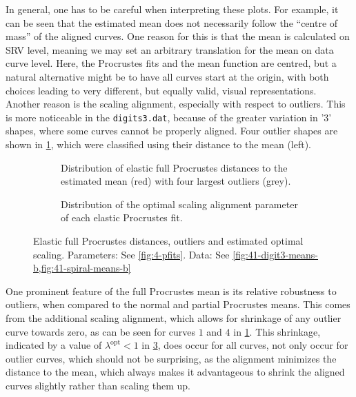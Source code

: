 In general, one has to be careful when interpreting these plots.
For example, it can be seen that the estimated mean does not necessarily follow the \enquote{centre of mass} of the aligned curves. 
One reason for this is that the mean is calculated on SRV level, meaning we may set an arbitrary translation for the mean on data curve level.
Here, the Procrustes fits and the mean function are centred, but a natural alternative might be to have all curves start at the origin, with both choices leading to very different, but equally valid, visual representations.
Another reason is the scaling alignment, especially with respect to outliers.
This is more noticeable in the \texttt{digits3.dat}, because of the greater variation in '3' shapes, where some curves cannot be properly aligned.
Four outlier shapes are shown in \cref{fig:4-outliers}, which were classified using their distance to the mean (left). 
\begin{figure}
  \centering
  \begin{subfigure}[t]{0.59\textwidth}
    \begin{subfigure}[t]{0.40\textwidth}
      \centering
    \end{subfigure}
    \begin{subfigure}[t]{0.60\textwidth}
      \centering
    \end{subfigure}
    \caption{Distribution of elastic full Procrustes distances to the estimated mean (red) with four largest outliers (grey).}
  \label{fig:4-outliers}
  \end{subfigure}
  \begin{subfigure}[t]{0.39\textwidth}
    \centering
    \caption{Distribution of the optimal scaling alignment parameter of each elastic Procrustes fit.}
    \label{fig:4-bopts}
  \end{subfigure}
  \caption{Elastic full Procrustes distances, outliers and estimated optimal scaling. Parameters: See \cref{fig:4-pfits}. 
  Data: See \cref{fig:41-digit3-means-b,fig:41-spiral-means-b}}
\end{figure}
One prominent feature of the full Procrustes mean is its relative robustness to outliers, when compared to the normal and partial Procrustes means.
This comes from the additional scaling alignment, which allows for shrinkage of any outlier curve towards zero, as can be seen for curves $1$ and $4$ in \cref{fig:4-outliers}.
This shrinkage, indicated by a value of $\lambda^\mathrm{opt} < 1$ in \cref{fig:4-bopts}, does occur for all curves, not only occur for outlier curves, which should not be surprising, as the alignment minimizes the distance to the mean, which always makes it advantageous to shrink the aligned curves slightly rather than scaling them up.
